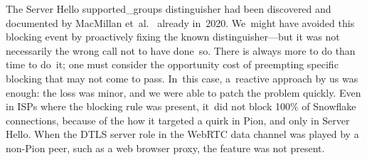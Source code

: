 \documentclass[letterpaper,twocolumn]{article}
\begin{document}
The Server Hello \mbox{supported\_groups} distinguisher
had been
discovered and documented by MacMillan et~al.~\cite[\S 3]{arxiv.2008.03254}
already in~2020.
We~might have avoided this blocking event by proactively fixing
the known distinguisher---but
it was not necessarily the wrong call not to have done~so.
There is always more to do than time to do~it;
one must consider the opportunity cost
of preempting specific blocking that may not come to pass.
In~this case, a~reactive approach by us was enough:
the loss was minor, and we were able to patch the problem quickly.
Even in ISPs where the blocking rule was present,
it~did not block 100\% of Snowflake connections,
because of the how it targeted a quirk in Pion,
and only in Server Hello.
When the DTLS server role in the WebRTC data channel
was played by a non-Pion peer,
such as a web browser proxy,
the feature was not present.

\end{document}
